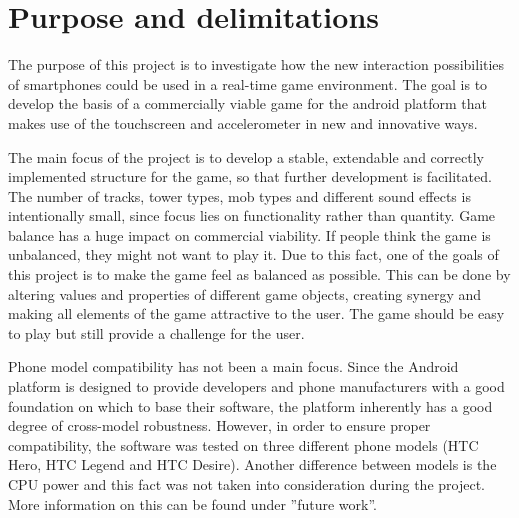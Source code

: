 \section{Purpose and delimitations}

The purpose of this project is to investigate how the new interaction possibilities of smartphones could be used in a real-time game environment. The goal is to develop the basis of a commercially viable game for the android platform that makes use of the touchscreen and accelerometer in new and innovative ways.

The main focus of the project is to develop a stable, extendable and correctly implemented structure for the game, so that further development is facilitated. The number of tracks, tower types, mob types and different sound effects is intentionally small, since focus lies on functionality rather than quantity.
Game balance has a huge impact on commercial viability. If people think the game is unbalanced, they might not want to play it. Due to this fact, one of the goals of this project is to make the game feel as balanced as possible. This can be done by altering values and properties of different game objects, creating synergy and making all elements of the game attractive to the user. The game should be easy to play but still provide a challenge for the user.

Phone model compatibility has not been a main focus. Since the Android platform is designed to provide developers and phone manufacturers with a good foundation on which to base their software, the platform inherently has a good degree of cross-model robustness. However, in order to ensure proper compatibility, the software was tested on three different phone models (HTC Hero, HTC Legend and HTC Desire). Another difference between models is the CPU power and this fact was not taken into consideration during the project. More information on this can be found under ''future work''.